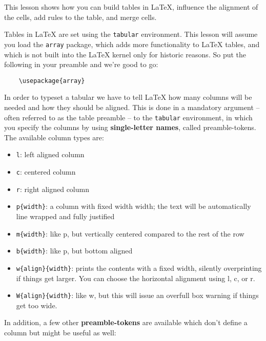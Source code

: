 \documentclass{article}
\begin{document}
This lesson shows how you can build tables in LaTeX, influence the alignment of the cells, add rules to the table, and merge cells.
\vspace{0.5cm}

Tables in LaTeX are set using the \verb|tabular| environment. This lesson will assume you load the \texttt{array} package, which adds more functionality to LaTeX tables, and which is not built into the LaTeX kernel only for historic reasons. So put the following in your preamble and we’re good to go:

\begin{verbatim}
    \usepackage{array}
\end{verbatim}

In order to typeset a tabular we have to tell LaTeX how many columns will be needed and how they should be aligned. This is done in a mandatory argument – often referred to as the table preamble – to the \texttt{tabular} environment, in which you specify the columns by using \textbf{single-letter names}, called preamble-tokens. The available column types are:

\begin{itemize}
    \item \texttt{l}:	left aligned column
    \item \texttt{c}:	centered column
    \item \texttt{r}:	right aligned column
    \item \texttt{p\{width\}}: a column with fixed width width; the text will be automatically line wrapped and fully justified
    \item \texttt{m\{width\}}: like p, but vertically centered compared to the rest of the row
    \item \texttt{b\{width\}}: like p, but bottom aligned
    \item \texttt{w\{align\}\{width\}}: prints the contents with a fixed width, silently overprinting if things get larger. You can choose the horizontal alignment using l, c, or r.
    \item \texttt{W\{align\}\{width\}}: like w, but this will issue an overfull box warning if things get too wide.
\end{itemize}

In addition, a few other \textbf{preamble-tokens} are available which don’t define a column but might be useful as well:
\end{document}

